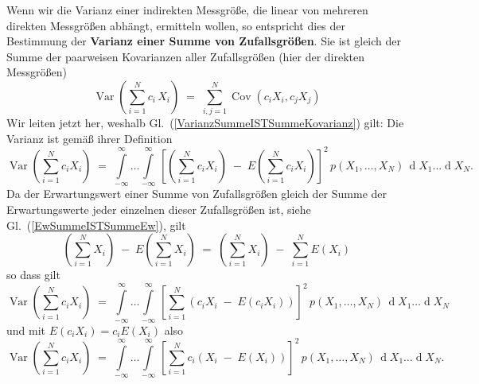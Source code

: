 Wenn wir die Varianz einer indirekten Messgröße, die linear von mehreren direkten Messgrößen
abhängt, ermitteln wollen, so entspricht dies der Bestimmung der
\textbf{Varianz einer Summe von Zufallsgrößen}. Sie ist gleich der Summe der
paarweisen Kovarianzen aller Zufallsgrößen (hier der direkten Messgrößen)
\begin{equation}
\operatorname {Var}\left(\sum _{{i=1}}^{N} c_i \, X_{i}\right) \; = \;
\sum _{{i,j=1}}^{N}\operatorname {Cov}(c_i X_{i},c_j X_{j})
\label{VarianzSummeISTSummeKovarianz}
\end{equation}
Wir leiten jetzt her, weshalb Gl.~(\ref{VarianzSummeISTSummeKovarianz}) gilt:
Die Varianz ist gemäß ihrer Definition
\begin{equation}
\operatorname {Var}\left(\sum _{{i=1}}^{N}c_i X_{i}\right) \; = \;
\int\limits_{-\infty}^{\infty} \dots \int\limits_{-\infty}^{\infty}
\, \left[ \left(\sum_{i=1}^N c_i X_i\right) \; - \; E(\sum_{i=1}^N c_i X_i) \right]^2 \, p(X_1, \dots, X_N)
\, \operatorname{d}X_1 \dots \operatorname{d}X_N .
\end{equation}
Da der Erwartungswert einer Summe von Zufallsgrößen gleich der Summe der
Erwartungswerte jeder einzelnen dieser Zufallsgrößen ist, siehe Gl.~(\ref{EwSummeISTSummeEw}), gilt
$$
\left(\sum_{i=1}^N X_i \right) \; - \; E(\sum_{i=1}^N X_i) \; = \;
\left(\sum_{i=1}^N X_i \right) \; - \; \sum_{i=1}^N E(X_i)
$$
so dass gilt
\begin{equation}
\operatorname {Var}\left(\sum _{{i=1}}^{N}c_i X_{i}\right) \; = \;
\int\limits_{-\infty}^{\infty} \dots \int\limits_{-\infty}^{\infty}
\, \left[ \sum_{i=1}^N \left(c_i X_i \; - \; E(c_i X_i)\right) \right]^2 \, p(X_1, \dots, X_N)
\, \operatorname{d}X_1 \dots \operatorname{d}X_N
\end{equation}
und mit $E(c_i X_i) = c_i E(X_i)$ also
\begin{equation}
\operatorname {Var}\left(\sum _{{i=1}}^{N}c_i X_{i}\right) \; = \;
\int\limits_{-\infty}^{\infty} \dots \int\limits_{-\infty}^{\infty}
\, \left[ \sum_{i=1}^N c_i \left( X_i \; - \; E(X_i)\right) \right]^2 \, p(X_1, \dots, X_N)
\, \operatorname{d}X_1 \dots \operatorname{d}X_N .
\end{equation}

